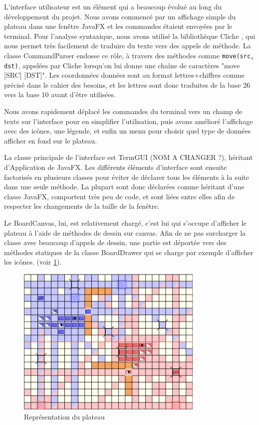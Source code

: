 \documentclass[a4paper]{report}
\begin{document}
L'interface utilisateur est un élément qui a beaucoup évolué au long du développement du projet. Nous avons commencé par un affichage simple du plateau dans une fenêtre JavaFX et les commandes étaient envoyées par le terminal. Pour l'analyse syntaxique, nous avons utilisé la bibliothèque Cliche \cite{cliche}, qui nous permet très facilement de traduire du texte vers des appels de méthode. La classe CommandParser endosse ce rôle, à travers des méthodes comme {\tt move(src, dst)}, appelées par Cliche lorsqu'on lui donne une chaîne de caractères "move [SRC] [DST]". Les coordonnées données sont au format lettres+chiffres comme précisé dans le cahier des besoins, et les lettres sont donc traduites de la base 26 vers la base 10 avant d'être utilisées.

Nous avons rapidement déplacé les commandes du terminal vers un champ de texte sur l'interface pour en simplifier l'utilisation, puis avons amélioré l'affichage avec des icônes, une légende, et enfin un menu pour choisir quel type de données afficher en fond sur le plateau.

La classe principale de l'interface est TermGUI (NOM A CHANGER ?), héritant d'Application de JavaFX. Les différents éléments d'interface sont ensuite factorisés en plusieurs classes pour éviter de déclarer tous les éléments à la suite dans une seule méthode. La plupart sont donc déclarées comme héritant d'une classe JavaFX, comportent très peu de code, et sont liées entre elles afin de respecter les changements de la taille de la fenêtre.

Le BoardCanvas, lui, est relativement chargé, c'est lui qui s'occupe d'afficher le plateau à l'aide de méthodes de dessin sur canvas. Afin de ne pas surcharger la classe avec beaucoup d'appels de dessin, une partie est déportée vers des méthodes statiques de la classe BoardDrawer qui se charge par exemple d'afficher les icônes. (voir \ref{fig:plateau}).

\begin{figure}[h]
\centering
\includegraphics[width=0.8\textwidth]{interface/plateau}
\caption{Représentation du plateau}\label{fig:plateau}
\end{figure}
\end{document}

